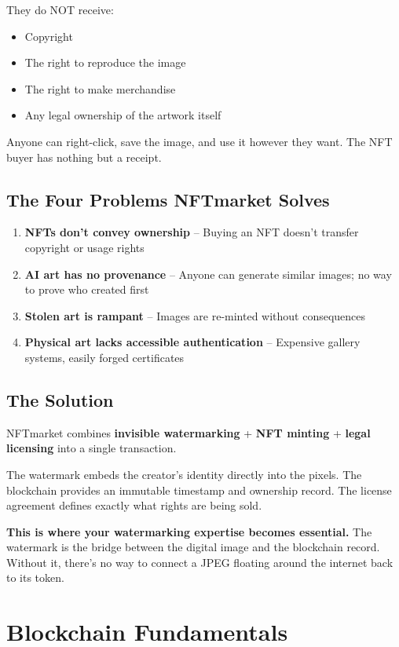 \documentclass[11pt,a4paper]{article}
\newcommand{\keyword}[1]{\textbf{\textcolor{accentcolor}{#1}}}
\begin{document}
They do NOT receive:
\begin{itemize}
    \item Copyright
    \item The right to reproduce the image
    \item The right to make merchandise
    \item Any legal ownership of the artwork itself
\end{itemize}

Anyone can right-click, save the image, and use it however they want. The NFT buyer has nothing but a receipt.

\subsection{The Four Problems NFTmarket Solves}

\begin{enumerate}
    \item \textbf{NFTs don't convey ownership} -- Buying an NFT doesn't transfer copyright or usage rights
    \item \textbf{AI art has no provenance} -- Anyone can generate similar images; no way to prove who created first
    \item \textbf{Stolen art is rampant} -- Images are re-minted without consequences
    \item \textbf{Physical art lacks accessible authentication} -- Expensive gallery systems, easily forged certificates
\end{enumerate}

\subsection{The Solution}

NFTmarket combines \keyword{invisible watermarking} + \keyword{NFT minting} + \keyword{legal licensing} into a single transaction.

The watermark embeds the creator's identity directly into the pixels. The blockchain provides an immutable timestamp and ownership record. The license agreement defines exactly what rights are being sold.

\textbf{This is where your watermarking expertise becomes essential.} The watermark is the bridge between the digital image and the blockchain record. Without it, there's no way to connect a JPEG floating around the internet back to its token.

\newpage
\section{Blockchain Fundamentals}
\end{document}
